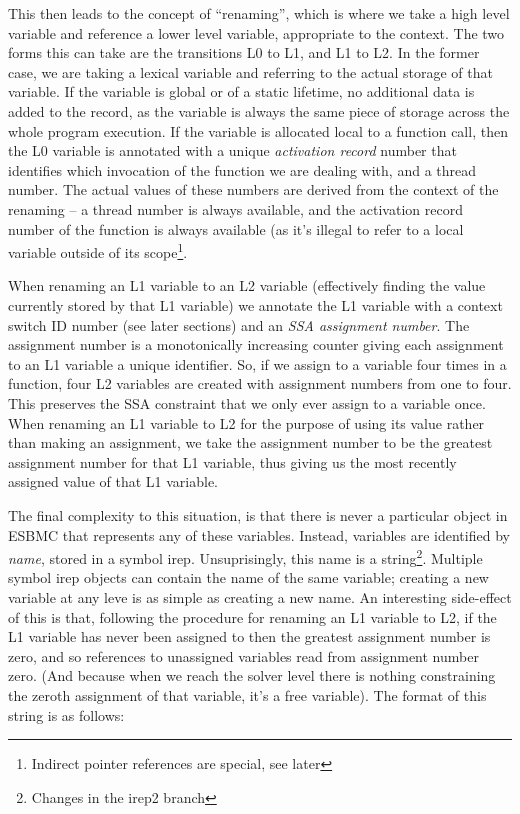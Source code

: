 \documentclass{article}
\begin{document}
This then leads to the concept of ``renaming'', which is where we take a high
level variable and reference a lower level variable, appropriate to the context.
The two forms this can take are the transitions L0 to L1, and L1 to L2. In the
former case, we are taking a lexical variable and referring to the actual
storage of that variable. If the variable is global or of a static lifetime,
no additional data is added to the record, as the variable is always the
same piece of storage across the whole program execution. If the variable is
allocated local to a function call, then the L0 variable is annotated with
a unique \textit{activation record} number that identifies which invocation
of the function we are dealing with, and a thread number. The actual values
of these numbers are derived from the context of the renaming -- a thread number
is always available, and the activation record number of the function is always
available (as it's illegal to refer to a local variable outside of its
scope\footnote{Indirect pointer references are special, see later}.


When renaming an L1 variable to an L2 variable (effectively finding the value
currently stored by that L1 variable) we annotate the L1 variable with
a context switch ID number (see later sections) and an \textit{SSA assignment
number}. The assignment number is a monotonically increasing counter giving each
assignment to an L1 variable a unique identifier. So, if we assign to a
variable four times in a function, four L2 variables are created with
assignment numbers from one to four. This preserves the SSA constraint that we
only ever assign to a variable once. When renaming an L1 variable to L2 for the
purpose of using its value rather than making an assignment, we take the
assignment number to be the greatest assignment number for that L1 variable,
thus giving us the most recently assigned value of that L1 variable.

The final complexity to this situation, is that there is never a particular
object in ESBMC that represents any of these variables. Instead, variables
are identified by \textit{name}, stored in a symbol irep. Unsuprisingly, this
name is a string\footnote{Changes in the irep2 branch}. Multiple symbol irep
objects can contain the name of the same variable; creating a new variable
at any leve is as simple as creating a new name. An interesting side-effect
of this is that, following the procedure for renaming an L1 variable to L2,
if the L1 variable has never been assigned to then the greatest assignment
number is zero, and so references to unassigned variables read from assignment
number zero. (And because when we reach the solver level there is nothing
constraining the zeroth assignment of that variable, it's a free variable).
The format of this string is as follows:
\end{document}
